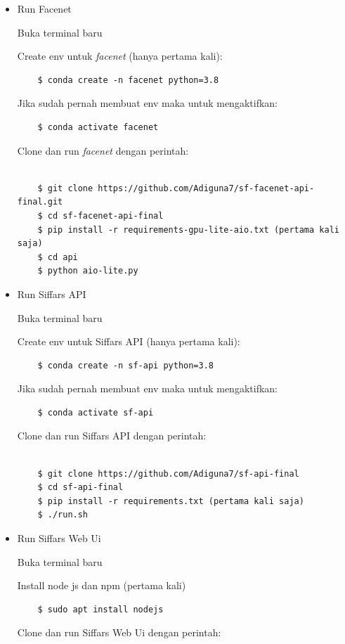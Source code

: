 \begin{itemize}
  \item Run Facenet
  
  Buka terminal baru 

  Create env untuk \textit{facenet} (hanya pertama kali):
  \begin{lstlisting}
    $ conda create -n facenet python=3.8
  \end{lstlisting}
  Jika sudah pernah membuat env maka untuk mengaktifkan:
  \begin{lstlisting}
    $ conda activate facenet
  \end{lstlisting}
  Clone dan run \textit{facenet} dengan perintah:
  \begin{lstlisting}

    $ git clone https://github.com/Adiguna7/sf-facenet-api-final.git        
    $ cd sf-facenet-api-final
    $ pip install -r requirements-gpu-lite-aio.txt (pertama kali saja)
    $ cd api
    $ python aio-lite.py
  \end{lstlisting}

  \item Run Siffars API
  
  Buka terminal baru 
  
  Create env untuk Siffars API (hanya pertama kali):
  \begin{lstlisting}
    $ conda create -n sf-api python=3.8
  \end{lstlisting}
  Jika sudah pernah membuat env maka untuk mengaktifkan:
  \begin{lstlisting}
    $ conda activate sf-api
  \end{lstlisting}
  Clone dan run Siffars API dengan perintah:
  \begin{lstlisting}

    $ git clone https://github.com/Adiguna7/sf-api-final
    $ cd sf-api-final
    $ pip install -r requirements.txt (pertama kali saja)
    $ ./run.sh
  \end{lstlisting}

  \item Run Siffars Web Ui
  
  Buka terminal baru

  Install node js dan npm (pertama kali)
  \begin{lstlisting}
    $ sudo apt install nodejs
  \end{lstlisting}

  Clone dan run Siffars Web Ui dengan perintah:
  \begin{lstlisting}


\end{lstlisting}
\end{itemize}
